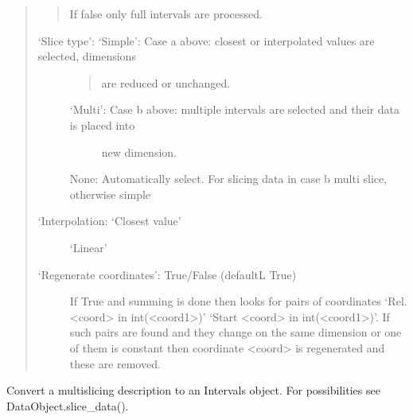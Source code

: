 \documentclass[letterpaper,10pt,english]{sphinxmanual}
\begin{document}
\begin{fulllineitems}
\begin{fulllineitems}
\begin{quote}
\begin{description}
\begin{quote}
If false only full intervals are processed.
\end{quote}
\begin{description}
\item[{‘Slice type’: ‘Simple’: Case a above: closest or interpolated values are selected, dimensions}] \leavevmode\begin{quote}

are reduced or unchanged.
\end{quote}
\begin{description}
\item[{‘Multi’: Case b above: multiple intervals are selected and their data is placed into}] \leavevmode
new dimension.

\end{description}

None: Automatically select. For slicing data in case b multi slice, otherwise simple

\item[{‘Interpolation: ‘Closest value’}] \leavevmode
‘Linear’

\item[{‘Regenerate coordinates’: True/False  (defaultL True)}] \leavevmode
If True and summing is done then looks for pairs of coordinates
‘Rel. \textless{}coord\textgreater{} in int(\textless{}coord1\textgreater{})’  ‘Start \textless{}coord\textgreater{} in int(\textless{}coord1\textgreater{})’.
If such pairs are found and they change on the same dimension or one of them is constant then
coordinate \textless{}coord\textgreater{} is regenerated and these are removed.

\end{description}

\end{description}
\end{quote}

\end{fulllineitems}


\begin{fulllineitems}
\label{\detokenize{data_object:flap.data_object.DataObject.slicing_to_intervals}}
Convert a multi\sphinxhyphen{}slicing description to an Intervals object.
For possibilities see DataObject.slice\_data().


\end{fulllineitems}
\end{fulllineitems}
\end{document}
